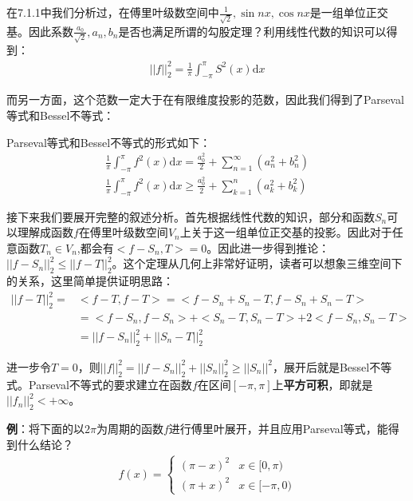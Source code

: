 \documentclass{ctexart}
\let\oldtextbf\textbf
\renewcommand{\textbf}[1]{\textcolor{brown!50!red}{\oldtextbf{#1}}}
\begin{document}
在7.1.1中我们分析过，在傅里叶级数空间中$\frac{1}{\sqrt{2}},\sin nx,\cos nx$是一组单位正交基。因此系数$\frac{a_0}{\sqrt{2}},a_n,b_n$是否也满足所谓的勾股定理？利用线性代数的知识可以得到：
\begin{align*}
    ||f||_2^2=\frac{1}{\pi}\int_{-\pi}^\pi S^2(x)\mathrm{d}x
\end{align*}

而另一方面，这个范数一定大于在有限维度投影的范数，因此我们得到了Parseval等式和Bessel不等式：
\begin{tcolorbox}[
    colback=bac2,     %
    colframe=fra2,   %
    coltitle=white,             %
    coltext=tex2,
    title=Parseval等式和Bessel不等式,
    fonttitle=\bfseries,        %
arc=3mm,                     %
breakable
]
Parseval等式和Bessel不等式的形式如下：
\begin{align*}
    \frac{1}{\pi}\int_{-\pi}^\pi f^2(x)\mathrm{d}x=\frac{a_0^2}{2}+\sum_{n=1}^\infty(a_n^2+b_n^2)\\
    \frac{1}{\pi}\int_{-\pi}^\pi f^2(x)\mathrm{d}x\geq \frac{a_0^2}{2}+\sum_{k=1}^n(a_k^2+b_k^2)
\end{align*}
\end{tcolorbox}

接下来我们要展开完整的叙述分析。首先根据线性代数的知识，部分和函数$S_n$可以理解成函数$f$在傅里叶级数空间$V_n$上关于这一组单位正交基的投影。因此对于任意函数$T_n\in V_n$,都会有$<f-S_n,T>=0$。因此进一步得到推论：$||f-S_n||_2^2\leq ||f-T||_2^2$。这个定理从几何上非常好证明，读者可以想象三维空间下的关系，这里简单提供证明思路：
\begin{align*}
    ||f-T||^2_2=&<f-T,f-T>=<f-S_n+S_n-T,f-S_n+S_n-T>\\
    &=<f-S_n,f-S_n>+<S_n-T,S_n-T>+2<f-S_n,S_n-T>\\
    &=||f-S_n||_2^2+||S_n-T||_2^2
\end{align*}

进一步令$T=0$，则$||f||_2^2=||f-S_n||^2_2+||S_n||_2^2\geq ||S_n||^2$，展开后就是Bessel不等式。Parseval不等式的要求建立在函数$f$在区间$[-\pi,\pi]$上\textbf{\color{brown!50!red}平方可积}，即就是$||f_n||_2^2<+\infty$。

\textbf{\color{brown!50!red}例}：将下面的以$2\pi$为周期的函数$f$进行傅里叶展开，并且应用Parseval等式，能得到什么结论？
\begin{align*}
    f(x)=\begin{cases}
        (\pi-x)^2 & x\in[0,\pi)\\
        (\pi+x)^2 & x\in [-\pi,0)
    \end{cases}
\end{align*}
\end{document}
